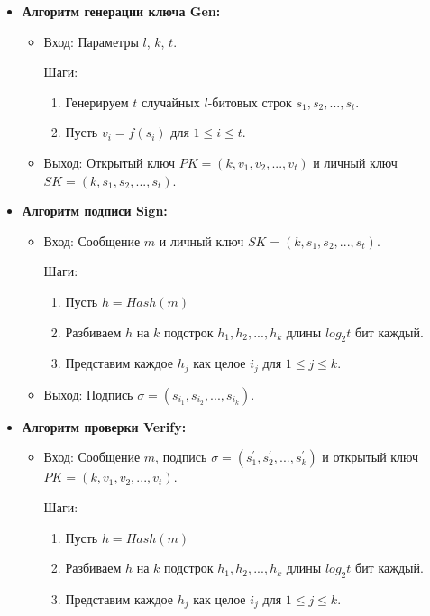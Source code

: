 \documentclass[a4paper, 14pt]{extarticle}
\begin{document}
\begin{itemize}
    \item \textbf{Алгоритм генерации ключа Gen:}

    \begin{itemize}
        \item Вход: Параметры $l$, $k$, $t$.

        Шаги:
        \begin{enumerate}
            \item Генерируем $t$ случайных $l$-битовых строк $s_{1}, s_{2}, ..., s_{t}$.
            \item Пусть $v_{i} = f(s_{i})$ для $1 \leq i \leq t$.
        \end{enumerate}

        \item Выход: Открытый ключ $PK = (k, v_{1}, v_{2}, ..., v_{t})$ и личный ключ $SK = (k, s_{1}, s_{2}, ..., s_{t})$.
    \end{itemize}

    \item \textbf{Алгоритм подписи Sign:}

    \begin{itemize}
        \item Вход: Сообщение $m$ и личный ключ $SK = (k, s_{1}, s_{2}, ..., s_{t})$.

        Шаги:
        \begin{enumerate}
            \item Пусть $h = Hash(m)$
            \item Разбиваем $h$ на $k$ подстрок $h_{1}, h_{2}, ..., h_{k}$ длины $log_{2}t$ бит каждый.
            \item Представим каждое $h_{j}$ как целое $i_{j}$ для $1 \leq j \leq k$.
        \end{enumerate}

        \item Выход: Подпись $\sigma = (s_{i_{1}}, s_{i_{2}}, ..., s_{i_{k}})$.
    \end{itemize}

    \item \textbf{Алгоритм проверки Verify:}

    \begin{itemize}
        \item Вход: Сообщение $m$, подпись $\sigma = (s^{'}_{1}, s^{'}_{2}, ..., s^{'}_{k})$ и открытый ключ $PK = (k, v_{1}, v_{2}, ..., v_{t})$.

        Шаги:
        \begin{enumerate}
            \item Пусть $h = Hash(m)$
            \item Разбиваем $h$ на $k$ подстрок $h_{1}, h_{2}, ..., h_{k}$ длины $log_{2}t$ бит каждый.
            \item Представим каждое $h_{j}$ как целое $i_{j}$ для $1 \leq j \leq k$.
        \end{enumerate}


\end{itemize}
\end{itemize}
\end{document}
